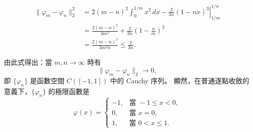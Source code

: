 \documentclass[11pt,a4paper,twoside]{article}
\newif\ifstudynotes
\newcommand{\StudyNote}[2]{%
    \ifstudynotes
    \begin{studyNote}[title={#1}]
    #2
    \end{studyNote}
    \fi
}
\newcommand{\pnum}[1]{%
    \makebox[0pt][r]{%
        \scriptsize\textbf{[#1]}\hspace{0.7em}%
    }%
}
\begin{document}
\StudyNote{複習註解：為什麼這裡要拆積分區間？}{
    因為題設 $m>n$，所以 $\frac1m<\frac1n$。

    在正半軸 $0\le x\le1$ 上，
    \[
        \varphi_k(x)=
        \begin{cases}
            kx, & 0\le x\le \frac1k, \\[1mm]
            1,  & \frac1k\le x\le1.
        \end{cases}
    \]

    因此要依照 $\varphi_m$、$\varphi_n$ 的分段點，
    將 $[0,1]$ 分成
    \[
        \left[0,\frac1m\right],\qquad
        \left[\frac1m,\frac1n\right],\qquad
        \left[\frac1n,1\right].
    \]

    \textbf{第一段：}
    當 $0\le x\le\frac1m$ 時，兩個函數都還在斜線區，因此
    \[
        \varphi_m(x)=mx,\qquad
        \varphi_n(x)=nx,
    \]
    所以
    \[
        |\varphi_m-\varphi_n|^2=|mx-nx|^2.
    \]

    \textbf{第二段：}
    當 $\frac1m\le x\le\frac1n$ 時，
    $\varphi_m$ 已進入常數區，而 $\varphi_n$ 仍在斜線區，因此
    \[
        \varphi_m(x)=1,\qquad
        \varphi_n(x)=nx,
    \]
    所以
    \[
        |\varphi_m-\varphi_n|^2=|1-nx|^2.
    \]

    \textbf{第三段：}
    當 $\frac1n\le x\le1$ 時，兩者皆為 $1$，因此
    \[
        |\varphi_m-\varphi_n|^2=0.
    \]
    所以這一段的積分為零，作者便直接省略。

    因此
    \[
        \boxed{
            2\int_0^1|\varphi_m-\varphi_n|^2\,dx
            =
            2\int_0^{1/m}|mx-nx|^2\,dx
            +
            2\int_{1/m}^{1/n}|1-nx|^2\,dx
        }.
    \]

    \textbf{重點：}這一步是在依照分段函數的定義拆分積分區間，
    並不是做變數代換。
}

\[
    \begin{aligned}
        \|\varphi_m-\varphi_n\|_2^2
         & =
        2(m-n)^2
        \int_{0}^{1/m}x^2\,dx
        -
        \left.
        \frac{2}{3n}(1-nx)^3
        \right|_{1/m}^{1/n}
        \\
         & =
        \frac{2(m-n)^2}{3m^3}
        +
        \frac{2}{3n}
        \left(1-\frac{n}{m}\right)^3
        \\
         & =
        \frac{2(m-n)^2}{3m^2n}
        \le
        \frac{2}{3n}.
    \end{aligned}
\]

\noindent
\pnum{37}
由此式得出：當 $m,n\to\infty$ 時有
\[
    \|\varphi_m-\varphi_n\|_2\to0,
\]
即 $\{\varphi_n\}$ 是函數空間 $C([-1,1])$ 中的 Cauchy 序列。
顯然，在普通逐點收斂的意義下，$\{\varphi_n\}$ 的極限函數是
\begin{equation}
    \varphi(x)
    =
    \begin{cases}
        -1, & \text{當 } -1\le x<0, \\
        0,  & \text{當 } x=0,       \\
        1,  & \text{當 } 0<x\le1.
    \end{cases}
    \tag{2.1.3}
\end{equation}
\end{document}
